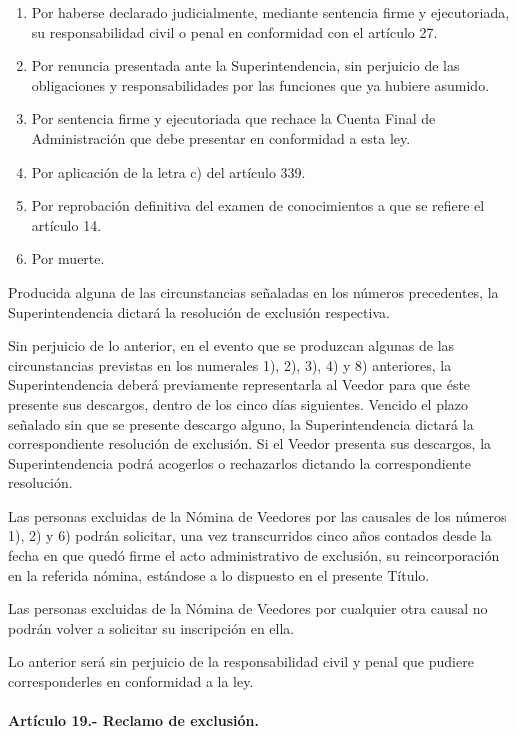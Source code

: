 \documentclass[
]{book}
\begin{document}
\begin{enumerate}
\def\labelenumi{\arabic{enumi})}
\setcounter{enumi}{4}
\item
  Por haberse declarado judicialmente, mediante sentencia firme y ejecutoriada, su responsabilidad civil o penal en conformidad con el artículo 27.
\item
  Por renuncia presentada ante la Superintendencia, sin perjuicio de las obligaciones y responsabilidades por las funciones que ya hubiere asumido.
\item
  Por sentencia firme y ejecutoriada que rechace la Cuenta Final de Administración que debe presentar en conformidad a esta ley.
\item
  Por aplicación de la letra c) del artículo 339.
\item
  Por reprobación definitiva del examen de conocimientos a que se refiere el artículo 14.
\item
  Por muerte.
\end{enumerate}

Producida alguna de las circunstancias señaladas en los números precedentes, la Superintendencia dictará la resolución de exclusión respectiva.

Sin perjuicio de lo anterior, en el evento que se produzcan algunas de las circunstancias previstas en los numerales 1), 2), 3), 4) y 8) anteriores, la Superintendencia deberá previamente representarla al Veedor para que éste presente sus descargos, dentro de los cinco días siguientes. Vencido el plazo señalado sin que se presente descargo alguno, la Superintendencia dictará la correspondiente resolución de exclusión. Si el Veedor presenta sus descargos, la Superintendencia podrá acogerlos o rechazarlos dictando la correspondiente resolución.

Las personas excluidas de la Nómina de Veedores por las causales de los números 1), 2) y 6) podrán solicitar, una vez transcurridos cinco años contados desde la fecha en que quedó firme el acto administrativo de exclusión, su reincorporación en la referida nómina, estándose a lo dispuesto en el presente Título.

Las personas excluidas de la Nómina de Veedores por cualquier otra causal no podrán volver a solicitar su inscripción en ella.

Lo anterior será sin perjuicio de la responsabilidad civil y penal que pudiere corresponderles en conformidad a la ley.

\hypertarget{artuxedculo-19.--reclamo-de-exclusiuxf3n.}{%
\paragraph*{Artículo 19.- Reclamo de exclusión.}\label{artuxedculo-19.--reclamo-de-exclusiuxf3n.}}
\end{document}
